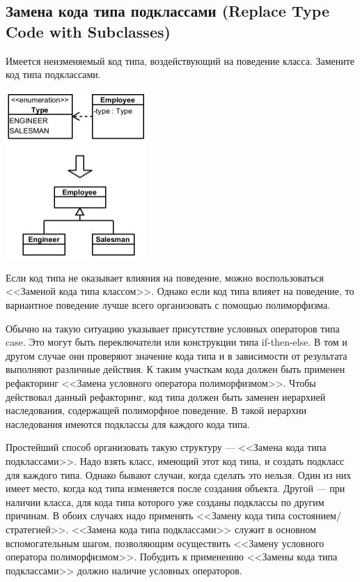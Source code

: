 \documentclass{../../text-style}
\begin{document}
\subsection{Замена кода типа подклассами (Replace Type Code with Subclasses)}

Имеется неизменяемый код типа, воздействующий на поведение класса. Замените код типа подклассами.

\begin{center}
    \includegraphics[width=0.4\textwidth]{replaceTypeCodeWithSubclass.png}
\end{center}

Если код типа не оказывает влияния на поведение, можно воспользоваться <<Заменой кода типа классом>>. Однако если код типа влияет на поведение, то вариантное поведение лучше всего организовать с помощью полиморфизма.

Обычно на такую ситуацию указывает присутствие условных операторов типа case. Это могут быть переключатели или конструкции типа if-then-else. В том и другом случае они проверяют значение кода типа и в зависимости от результата выполняют различные действия. К таким участкам кода должен быть применен рефакторинг <<Замена условного оператора полиморфизмом>>. Чтобы действовал данный рефакторинг, код типа должен быть заменен иерархией наследования, содержащей полиморфное поведение. В такой иерархии наследования имеются подклассы для каждого кода типа.

Простейший способ организовать такую структуру --- <<Замена кода типа подклассами>>. Надо взять класс, имеющий этот код типа, и создать подкласс для каждого типа. Однако бывают случаи, когда сделать это нельзя. Один из них имеет место, когда код типа изменяется после создания объекта. Другой --- при наличии класса, для кода типа которого уже созданы подклассы по другим причинам. В обоих случаях надо применять <<Замену кода типа состоянием/стратегией>>. <<Замена кода типа подклассами>> служит в основном вспомогательным шагом, позволяющим осуществить <<Замену условного оператора полиморфизмом>>. Побудить к применению <<Замены кода типа подклассами>> должно наличие условных операторов.
\end{document}

